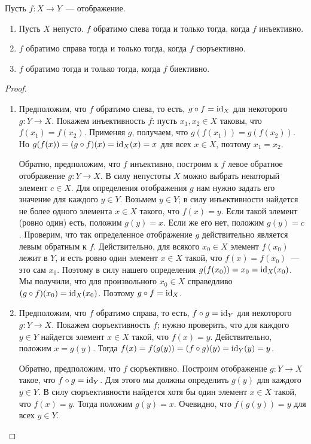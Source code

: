 \begin{theorem}\label{thm:sur-inj-reformulations}
Пусть $f\colon X\to Y$~--- отображение.
\begin{enumerate}
\item Пусть $X$ непусто. $f$ обратимо слева тогда и только тогда,
  когда $f$ инъективно.
\item $f$ обратимо справа тогда и только тогда, когда $f$ сюръективно.
\item $f$ обратимо тогда и только тогда, когда $f$ биективно.
\end{enumerate}
\end{theorem}
\begin{proof}
\begin{enumerate}
\item
Предположим, что $f$ обратимо слева, то есть, $g\circ f = \operatorname{id}_X$ для
некоторого $g\colon Y\to X$. Покажем инъективность $f$: пусть
$x_1,x_2\in X$ таковы, что $f(x_1) = f(x_2)$. Применяя $g$, получаем,
что $g(f(x_1)) = g(f(x_2))$. Но $g(f(x)) = (g\circ f)(x) = \operatorname{id}_X(x) =
x$ для всех $x\in X$, поэтому $x_1 = x_2$.

Обратно, предположим, что $f$ инъективно, построим к $f$ левое
обратное отображение $g\colon Y\to X$. В силу непустоты $X$ можно
выбрать некоторый элемент $c\in X$. Для определения отображения $g$
нам нужно задать его значение для каждого $y\in Y$. Возьмем $y\in Y$;
в силу инъективности найдется не более одного элемента $x\in X$
такого, что $f(x) = y$. Если такой элемент (ровно один) есть, положим
$g(y) = x$. Если же его нет, положим $g(y) = c$.
Проверим, что так определенное отображение $g$ действительно является
левым обратным к $f$. Действительно, для всякого $x_0\in X$ элемент
$f(x_0)$ лежит в $Y$, и есть ровно один элемент $x\in X$ такой, что
$f(x) = f(x_0)$~--- это сам $x_0$. Поэтому в силу нашего определения
$g(f(x_0)) = x_0 = \operatorname{id}_X(x_0)$. Мы получили, что для произвольного
$x_0\in X$ справедливо $(g\circ f)(x_0) = \operatorname{id}_X(x_0)$. Поэтому
$g\circ f = \operatorname{id}_X$.
\item
Предположим, что $f$ обратимо справа, то есть, $f\circ g = \operatorname{id}_Y$ для
некоторого $g\colon Y\to X$. Покажем сюръективность $f$; нужно
проверить, что для каждого $y\in Y$ найдется элемент $x\in X$ такой,
что $f(x) = y$. Действительно, положим $x = g(y)$. Тогда
$f(x) = f(g(y)) = (f\circ g)(y) = \operatorname{id}_Y(y) = y$.

Обратно, предположим, что $f$ сюръективно. Построим отображение
$g\colon Y\to X$ такое, что $f\circ g = \operatorname{id}_Y$. Для этого мы должны
определить $g(y)$ для каждого $y\in Y$. В силу сюръективности найдется
хотя бы один элемент $x\in X$ такой, что $f(x) = y$. Тогда положим
$g(y) = x$. Очевидно, что $f(g(y)) = y$ для всех $y\in Y$.


\end{enumerate}
\end{proof}
